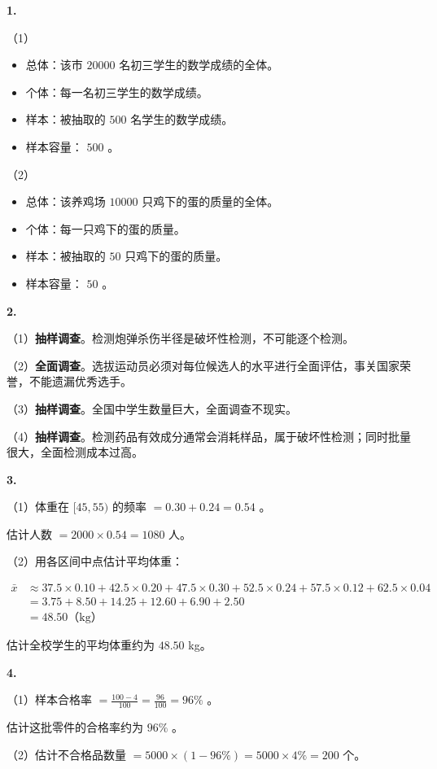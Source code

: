 \begin{answer}


\textbf{1.}

（1）
\begin{itemize}
  \item 总体：该市 $20000$ 名初三学生的数学成绩的全体。
  \item 个体：每一名初三学生的数学成绩。
  \item 样本：被抽取的 $500$ 名学生的数学成绩。
  \item 样本容量： $500$ 。
\end{itemize}


（2）
\begin{itemize}
  \item 总体：该养鸡场 $10000$ 只鸡下的蛋的质量的全体。
  \item 个体：每一只鸡下的蛋的质量。
  \item 样本：被抽取的 $50$ 只鸡下的蛋的质量。
  \item 样本容量： $50$ 。
\end{itemize}


\textbf{2.}

（1）\textbf{抽样调查}。检测炮弹杀伤半径是破坏性检测，不可能逐个检测。

（2）\textbf{全面调查}。选拔运动员必须对每位候选人的水平进行全面评估，事关国家荣誉，不能遗漏优秀选手。

（3）\textbf{抽样调查}。全国中学生数量巨大，全面调查不现实。

（4）\textbf{抽样调查}。检测药品有效成分通常会消耗样品，属于破坏性检测；同时批量很大，全面检测成本过高。

\textbf{3.}

（1）体重在 $[45, 55)$ 的频率 $= 0.30 + 0.24 = 0.54$ 。

估计人数 $= 2000 \times 0.54 = 1080$ 人。

（2）用各区间中点估计平均体重：

\[
\begin{aligned}
\bar{x} &\approx 37.5 \times 0.10 + 42.5 \times 0.20 + 47.5 \times 0.30 + 52.5 \times 0.24 + 57.5 \times 0.12 + 62.5 \times 0.04 \\
&= 3.75 + 8.50 + 14.25 + 12.60 + 6.90 + 2.50 \\
&= 48.50 \text{（kg）}
\end{aligned}
\]


估计全校学生的平均体重约为 $48.50$ kg。

\textbf{4.}

（1）样本合格率 $= \frac{100 - 4}{100} = \frac{96}{100} = 96\%$ 。

估计这批零件的合格率约为 $96\%$ 。

（2）估计不合格品数量 $= 5000 \times (1 - 96\%) = 5000 \times 4\% = 200$ 个。

\end{answer}
